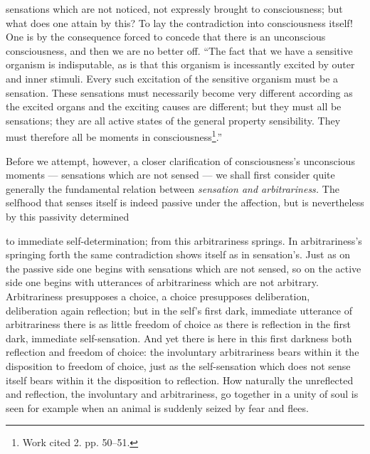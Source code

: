 \documentclass[12pt,a4paper]{book}
\begin{document}
\setcounter{footnote}{0}
sensations which are not noticed, not expressly brought to consciousness; but what
does one attain by this? To lay the contradiction into consciousness itself! One is
by the consequence forced to concede that there is an unconscious consciousness,
and then we are no better off. ``The fact that we have a sensitive organism is
indisputable, as is that this organism is incessantly excited by outer and inner
stimuli. Every such excitation of the sensitive organism must be a sensation. These
sensations must necessarily become very different according as the excited organs
and the exciting causes are different; but they must all be sensations; they are
all active states of the general property sensibility. They must therefore all be
moments in consciousness\footnote{Work cited 2. pp. 50--51.}.''

Before we attempt, however, a closer clarification of consciousness's unconscious
moments --- sensations which are not sensed --- we shall first consider quite
generally the fundamental relation between \emph{sensation and arbitrariness.} The
selfhood that senses itself is indeed passive under the affection, but is
nevertheless by this passivity determined

to immediate self-determination; from this arbitrariness springs. In
arbitrariness's springing forth the same contradiction shows itself as in
sensation's. Just as on the passive side one begins with sensations which are not
sensed, so on the active side one begins with utterances of arbitrariness which are
not arbitrary. Arbitrariness presupposes a choice, a choice presupposes
deliberation, deliberation again reflection; but in the self's first dark,
immediate utterance of arbitrariness there is as little freedom of choice as there
is reflection in the first dark, immediate self-sensation. And yet there is here in
this first darkness both reflection and freedom of choice: the involuntary
arbitrariness bears within it the disposition to freedom of choice, just as the
self-sensation which does not sense itself bears within it the disposition to
reflection. How naturally the unreflected and reflection, the involuntary and
arbitrariness, go together in a unity of soul is seen for example when an animal is
suddenly seized by fear and flees.
\end{document}
